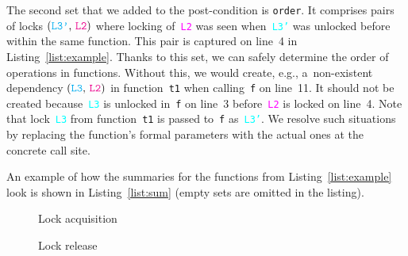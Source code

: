 \documentclass[runningheads]{llncs}
\begin{document}
The second set that we added to the post-condition is \texttt{order}. It
comprises pairs of locks $ (\text{\texttt{\textcolor{cyan}{L3'}}, 
\texttt{\textcolor{magenta}{L2}}}) $ where locking
of~\texttt{\textcolor{magenta}{L2}} was seen
when~\texttt{\textcolor{cyan}{L3'}} was unlocked before within the same
function. This pair is captured on line~4 in Listing~\ref{list:example}.
Thanks to this set, we can safely determine the order of operations in
functions. Without this, we would create, e.g., a~non-existent dependency
$ (\text{\texttt{\textcolor{cyan}{L3}}, \texttt{\textcolor{magenta}{L2}}}) $
in function~\texttt{t1} when calling~\texttt{f} on line~11. It should not
be created because~\texttt{\textcolor{cyan}{L3}} is unlocked in~\texttt{f}
on line~3 before~\texttt{\textcolor{magenta}{L2}} is locked on line~4. Note
that lock~\texttt{\textcolor{cyan}{L3}} from function~\texttt{t1} is
passed to~\texttt{f} as~\texttt{\textcolor{cyan}{L3'}}. We resolve such
situations by replacing the function's formal parameters with the
actual ones at the concrete call site.

\enlargethispage{4mm}

An example of how the summaries for the functions from
Listing~\ref{list:example} look is shown in Listing~\ref{list:sum}
(empty sets are omitted in the listing).

\begin{figure}[t]
\centering
\begin{minipage}{.54 \textwidth}
\centering
\begin{algorithm}[H]
%
%
    \caption{Lock acquisition}
    \label{alg:lock}
\end{algorithm}
\end{minipage}
\hfill
\begin{minipage}{.45 \textwidth}
\centering
\begin{algorithm}[H]
%
%
    \caption{Lock release}
    \label{alg:unlock}
\end{algorithm}
\end{minipage}
\vspace*{-6mm}
\end{figure}
\end{document}
